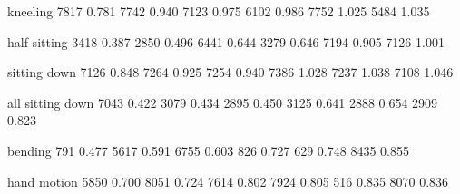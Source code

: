 kneeling
7817
0.781
7742
0.940
7123
0.975
6102
0.986
7752
1.025
5484
1.035



half sitting
3418
0.387
2850
0.496
6441
0.644
3279
0.646
7194
0.905
7126
1.001

sitting down
7126
0.848
7264
0.925
7254
0.940
7386
1.028
7237
1.038
7108
1.046

all sitting down
7043
0.422
3079
0.434
2895
0.450
3125
0.641
2888
0.654
2909
0.823


bending
791
0.477
5617
0.591
6755
0.603
826
0.727
629
0.748
8435
0.855


hand motion
5850
0.700
8051
0.724
7614
0.802
7924
0.805
516
0.835
8070
0.836

